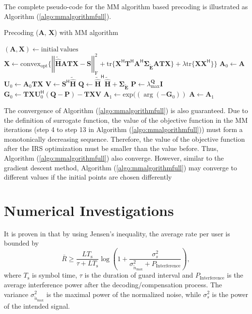 \documentclass[12pt,draftclsnofoot,onecolumn,journal]{IEEEtran}
\begin{document}
The complete pseudo-code for the MM algorithm based precoding is illustrated as Algorithm (\ref{algo:mmalgorithmfull}).
\begin{algorithm}
\caption{Precoding ($\mathbf{A}$, $\mathbf{X}$) with MM algorithm}
\begin{algorithmic}[1]
\State $ (\mathbf{A}, \mathbf{X}) \gets \mathrm{initial\ values} $
\State $\mathbf{X}\gets\mathrm{convex_{opt}}\{\left|\left|\tilde{\hat{\mathbf H}}\mathbf{ATX}-\mathbf{S}\right|\right|_{\mathrm{F}}^2+\mathrm{tr}\{\mathbf X^{\mathsf H}\mathbf T^{\mathsf H}\mathbf A^{\mathsf H}\pmb{\Sigma_{\tilde{\mathbf E}}}\mathbf{ATX}\}+\lambda\mathrm{tr}\{\mathbf X\mathbf X^{\mathsf H}\}\}$
	\State $\mathbf A_0\gets \mathbf A$
	\State $\mathbf U_0 \gets  \mathbf A_0\mathbf{TX}$
	\State $\mathbf V\gets\mathbf S^{\mathsf H}\tilde{\hat{\mathbf H}}$
	\State $\mathbf Q\gets\tilde{\hat{\mathbf H}}^{\mathsf H}\tilde{\hat{\mathbf H}}+\pmb{\Sigma_{\tilde{\mathbf E}}}$
	\State $\mathbf P\gets\lambda_{\mathrm{max}}^{\mathbf Q}\mathbf I$
	\State $\mathbf G_0\gets\mathbf{TX} \mathbf U_0^{\mathsf H}(\mathbf Q-\mathbf P)-\mathbf{TXV}$
	\State $\mathbf A_1\gets\mathrm{exp}((\arg ( -\mathbf G_0))$
	\State $\mathbf A\gets\mathbf A_1$
\EndWhile
\EndWhile
\end{algorithmic}
\label{algo:mmalgorithmfull}
\end{algorithm}
The convergence of Algorithm (\ref{algo:mmalgorithmfull}) is also guaranteed. Due to the definition of surrogate function, the value of the objective function in the MM iterations (step 4 to step 13 in Algorithm (\ref{algo:mmalgorithmfull})) must form a monotonically decreasing sequence. Therefore, the value of the objective function after the IRS optimization must be smaller than the value before. Thus, Algorithm (\ref{algo:mmalgorithmfull}) also converge. However, similar to the gradient descent method, Algorithm (\ref{algo:mmalgorithmfull}) may converge to different values if the initial points are chosen differently


\section{Numerical Investigations}
It is proven in \cite{sedaghat2017novel} that by using Jensen's inequality, the average rate per user is bounded by
\begin{equation}
\bar R\geq \frac{LT_{\mathrm{s}}}{\tau+LT_{\mathrm{s}}}\log\left(1+\frac{\sigma_s^2}{\sigma_{\tilde{n}_{\mathrm{max}}}^2+P_{\mathrm{Interference}}}\right),
\end{equation}
where $T_{\mathrm{s}}$ is symbol time, $\tau$ is the duration of guard interval and $P_{\mathrm{Interference}}$ is the average interference power after the decoding/compensation process. The variance $\sigma_{\tilde{n}_{\mathrm{max}}}^2$ is the maximal power of the normalized noise, while $\sigma_s^2$ is the power of the intended signal. 
\end{document}
